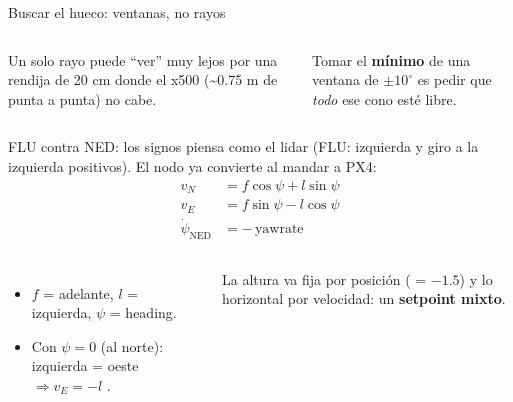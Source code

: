 \begin{frame}{Buscar el hueco: ventanas, no rayos}
  \begin{columns}[c]
    \centering
    \small
    Un solo rayo puede ``ver'' muy lejos por una rendija de 20 cm donde el x500 (\textasciitilde0.75 m de
    punta a punta) no cabe.
    \vspace{0.3em}

    Tomar el \textbf{mínimo} de una ventana de $\pm10^\circ$ es pedir que \emph{todo} ese cono esté libre.
  \end{columns}
\end{frame}

\begin{frame}{FLU contra NED: los signos}
  \small {} piensa como el lidar (FLU: izquierda y giro a la izquierda positivos). El nodo ya
  convierte al mandar a PX4:
  \[
    \begin{aligned}
      v_N &= f\cos\psi + l\sin\psi \\
      v_E &= f\sin\psi - l\cos\psi \\
      \dot\psi_{\text{NED}} &= -\,\text{yawrate}
    \end{aligned}
  \]
  \begin{columns}[c]
    \begin{itemize}
      \item $f$ = adelante, $l$ = izquierda, $\psi$ = heading.
      \item Con $\psi = 0$ (al norte): izquierda = oeste $\Rightarrow v_E = -l$ \ok.
    \end{itemize}
    \begin{idea}
      \small La altura va fija por posición ( = $-1.5$) y lo horizontal por velocidad: un
      \textbf{setpoint mixto}.
    \end{idea}
  \end{columns}
\end{frame}

